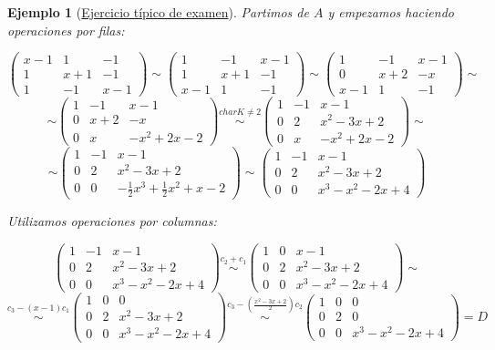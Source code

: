 \documentclass[11pt,a4paper]{article}
\theoremstyle{break}
\newtheorem{example}[theorem]{Ejemplo}
\begin{document}
\begin{example}[\underline{Ejercicio típico de examen}]
Partimos de $A$ y empezamos haciendo operaciones por filas:
\begin{scriptsize}
$$\begin{pmatrix}
x-1 & 1 & -1 \\
1 & x+1 & -1 \\
1 & -1 & x-1
\end{pmatrix} \sim \begin{pmatrix}
1 & -1 & x-1 \\
1 & x+1 & -1 \\
x-1 & 1 & -1
\end{pmatrix} \sim \begin{pmatrix}
1 & -1 & x-1 \\
0 & x+2 & -x \\
x-1 & 1 & -1
\end{pmatrix} \sim$$
$$\sim \begin{pmatrix}
1 & -1 & x-1 \\
0 & x+2 & -x \\
0 & x & -x^{2}+2x-2
\end{pmatrix} \overset{char K \neq 2}{\sim} \begin{pmatrix}
1 & -1 & x-1 \\
0 & 2 & x^{2}-3x+2 \\
0 & x & -x^{2}+2x-2
\end{pmatrix} \sim$$
$$\sim \begin{pmatrix}
1 & -1 & x-1 \\
0 & 2 & x^{2}-3x +2 \\
0 & 0 & -\frac{1}{2}x^{3}+\frac{1}{2}x^{2}+x-2
\end{pmatrix} \sim \begin{pmatrix}
1 & -1 & x-1 \\
0 & 2 & x^{2}-3x +2 \\
0 & 0 & x^{3}-x^{2}-2x+4
\end{pmatrix}$$
\end{scriptsize}
Utilizamos operaciones por columnas:
\begin{scriptsize}
$$\begin{pmatrix}
1 & -1 & x-1 \\
0 & 2 & x^{2}-3x +2 \\
0 & 0 & x^{3}-x^{2}-2x+4
\end{pmatrix} \overset{c_{2} + c_{1}}{\sim} \begin{pmatrix}
1 & 0 & x-1 \\
0 & 2 & x^{2}-3x+2 \\
0 & 0 & x^{3}-x^{2}-2x+4
\end{pmatrix} \sim$$
$$\overset{c_{3} - (x-1)c_{1}}{\sim} \begin{pmatrix}
1 & 0 & 0 \\
0 & 2 & x^{2}-3x+2 \\
0 & 0 & x^{3}-x^{2}-2x+4
\end{pmatrix} \overset{c_{3} - (\frac{x^{2}-3x+2}{2})c_{2}}{\sim} \begin{pmatrix}
1 & 0 & 0 \\
0 & 2 & 0 \\
0 & 0 & x^{3}-x^{2}-2x+4
\end{pmatrix} = D$$
\end{scriptsize}


\end{example}
\end{document}
